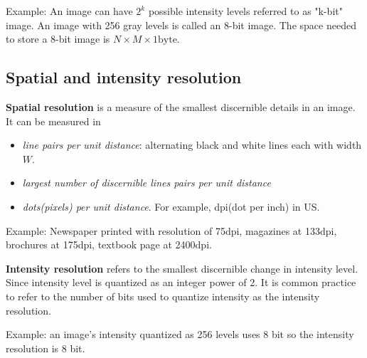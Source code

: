 \documentclass[UTF8]{ctexart}
\begin{document}
Example: An image can have $2^k$ possible intensity levels referred to as "k-bit" image. An image with 256 gray levels is called an 8-bit image. The space needed to store a 8-bit image is $N \times M \times 1 \text{byte}$.

\subsection{Spatial and intensity resolution}
\begin{definition}
	\textbf{Spatial resolution} is a measure of the smallest discernible details in an image. It can be measured in 
	\begin{itemize}
		\item \textit{line pairs per unit distance}: alternating black and white lines each with width $W$.
		\item \textit{largest number of discernible lines pairs per unit distance}
		\item \textit{dots(pixels) per unit distance}. For example, dpi(dot per inch) in US.
	\end{itemize}
\end{definition}

Example: Newspaper printed with resolution of 75dpi, magazines at 133dpi, brochures at 175dpi, textbook page at 2400dpi.

\begin{definition}
	\textbf{Intensity resolution} refers to the smallest discernible change in intensity level. Since intensity level is quantized as an integer power of 2. It is common practice to refer to the number of bits used to quantize intensity as the intensity resolution. 
\end{definition}

Example: an image's intensity quantized as 256 levels uses 8 bit so the intensity resolution is 8 bit.
\end{document}
